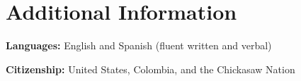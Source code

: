 \section{Additional Information}
\textbf{Languages:} English and Spanish (fluent written and verbal)\par
\textbf{Citizenship:} United States, Colombia, and the Chickasaw Nation
